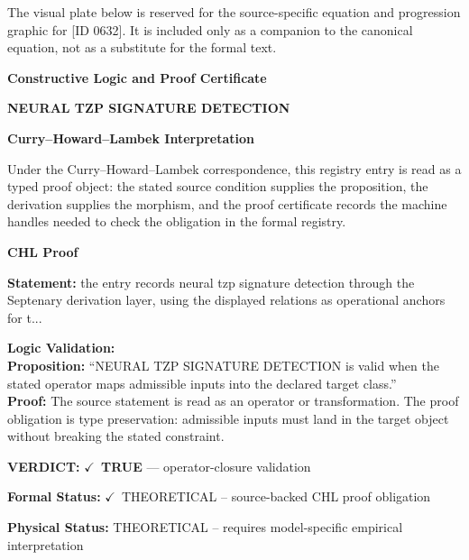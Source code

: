 \begingroup\footnotesize\sloppy
The visual plate below is reserved for the source-specific equation and progression graphic for [ID 0632]. It is included only as a companion to the canonical equation, not as a substitute for the formal text.
\par\endgroup
\ifTZPDarkEdition
{}
\fi

\clearpage
\begingroup\tzpsupportsetup
\noindent\textbf{\fontsize{10.8pt}{12.8pt}\selectfont [ID 0632] Constructive Logic and Proof Certificate}\par
\noindent\textbf{\fontsize{10pt}{12pt}\selectfont NEURAL TZP SIGNATURE DETECTION}\par
\vspace{0.45em}
\begingroup
\footnotesize
\setlength{\parskip}{0.22em}
\setlength{\parindent}{0pt}
\noindent\textbf{Curry--Howard--Lambek Interpretation}\par
Under the Curry--Howard--Lambek correspondence, this registry entry is read as a typed proof
object: the stated source condition supplies the proposition, the derivation supplies the
morphism, and the proof certificate records the machine handles needed to check the obligation
in the formal registry.

\vspace{0.45em}
\noindent\textbf{CHL Proof}\par
\textbf{Statement:} the entry records neural tzp signature detection through the Septenary derivation layer,
using the displayed relations as operational anchors for t...

\textbf{Logic Validation:}\\
\textbf{Proposition:} ``NEURAL TZP SIGNATURE DETECTION is valid when the stated operator maps admissible inputs
into the declared target class.''\\
\textbf{Proof:} The source statement is read as an operator or transformation. The proof obligation is
type preservation: admissible inputs must land in the target object without breaking the
stated constraint.

\textbf{VERDICT:} \ensuremath{\checkmark}\ \textbf{TRUE} --- operator-closure validation

\textbf{Formal Status:} \ensuremath{\checkmark}\ THEORETICAL -- source-backed CHL proof obligation

\textbf{Physical Status:} THEORETICAL -- requires model-specific empirical interpretation
\par\vspace{0.45em}
\par
\ifTZPDarkEdition
{}
\fi
\endgroup
\endgroup
